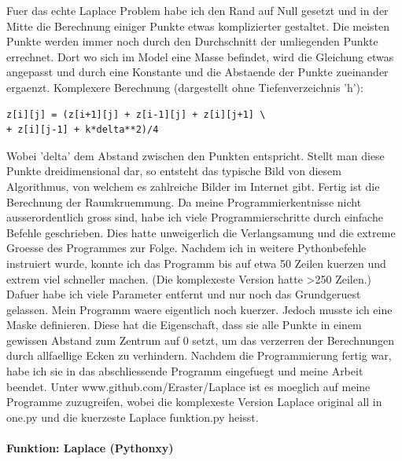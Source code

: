 \documentclass[pdftex,12pt,a4paper]{article}
\begin{document}
Fuer das echte Laplace Problem habe ich den Rand auf Null gesetzt und in der Mitte die Berechnung einiger Punkte etwas komplizierter gestaltet.
Die meisten Punkte werden immer noch durch den Durchschnitt der umliegenden Punkte errechnet.
Dort wo sich im Model eine Masse befindet, wird die Gleichung etwas angepasst und durch eine Konstante und die Abstaende der Punkte zueinander ergaenzt.
Komplexere Berechnung (dargestellt ohne Tiefenverzeichnis 'h'):
\begin{lstlisting}
z[i][j] = (z[i+1][j] + z[i-1][j] + z[i][j+1] \
+ z[i][j-1] + k*delta**2)/4  
\end{lstlisting}
Wobei 'delta' dem Abstand zwischen den Punkten entspricht. Stellt man diese Punkte dreidimensional dar, so entsteht das typische Bild von diesem Algorithmus, von welchem es zahlreiche Bilder im Internet gibt.
Fertig ist die Berechnung der Raumkruemmung.
Da meine Programmierkentnisse nicht ausserordentlich gross sind, habe ich viele Programmierschritte durch einfache Befehle geschrieben.
Dies hatte unweigerlich die Verlangsamung und die extreme Groesse des Programmes zur Folge.
Nachdem ich in weitere Pythonbefehle instruiert wurde, konnte ich das Programm bis auf etwa 50 Zeilen kuerzen und extrem viel schneller machen.
(Die komplexeste Version hatte \textgreater250 Zeilen.)
Dafuer habe ich viele Parameter entfernt und nur noch das Grundgeruest gelassen.
Mein Programm waere eigentlich noch kuerzer. Jedoch musste ich eine Maske definieren.
Diese hat die Eigenschaft, dass sie alle Punkte in einem gewissen Abstand zum Zentrum auf 0 setzt, um das verzerren der Berechnungen durch allfaellige Ecken zu verhindern.
Nachdem die Programmierung fertig war, habe ich sie in das abschliessende Programm eingefuegt und meine Arbeit beendet.
Unter www.github.com/Eraster/Laplace
ist es moeglich auf meine Programme zuzugreifen, wobei die komplexeste Version 
Laplace original all in one.py 
und die kuerzeste
Laplace funktion.py
heisst.


\paragraph {Funktion: Laplace (Pythonxy)}
\end{document}
